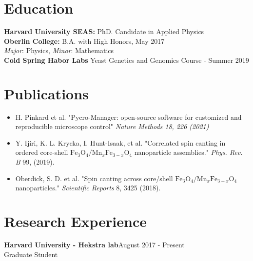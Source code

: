 \documentclass[margin]{res}
\begin{document}
 
 
\address{ianhuntisaak@g.harvard.edu}
\address{ianhi.github.io}

 
\begin{resume} 
	 
	\section{Education} 
	\textbf{Harvard University SEAS:} PhD. Candidate in Applied Physics\\%
	\textbf{Oberlin College:} B.A. with High Honors, May 2017 \\
	\textit{Major}: Physics, \textit{Minor}: Mathematics \\
	\textbf{Cold Spring Habor Labs} Yeast Genetics and Genomics Course - Summer 2019
	 

	\section{Publications}
	\begin{itemize}
		\item H. Pinkard et al. "Pycro-Manager: open-source software for customized and reproducible microscope control" {\it Nature Methods 18, 226 (2021)}
		\item Y. Ijiri, K. L. Krycka, I. Hunt-Isaak, et al.  "Correlated spin canting in ordered core-shell $\mathrm{Fe}_3\mathrm{O}_4/\mathrm{Mn}_x\mathrm{Fe}_{3-x}\mathrm{O}_4$ nanoparticle assemblies." {\it Phys. Rev. B} 99, (2019).
		\item Oberdick, S. D. et al.  "Spin canting across core/shell $\mathrm{Fe}_3\mathrm{O}_4/\mathrm{Mn}_x\mathrm{Fe}_{3-x}\mathrm{O}_4$ nanoparticles." {\it Scientific Reports} 8, 3425 (2018).
		
	\end{itemize}
	
	\section{Research Experience}
		{\bf Harvard University - Hekstra lab}\hfill August 2017 - Present\\ 
	Graduate Student
	

\end{resume}
\end{document}
